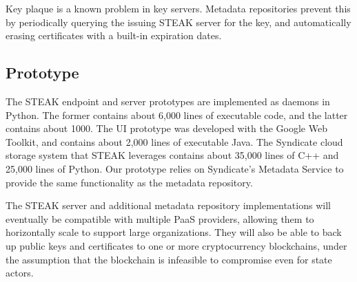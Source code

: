 Key plaque is a known problem in key servers.  Metadata repositories prevent this by periodically querying the issuing STEAK server for the key, and automatically erasing certificates with a built-in expiration dates.

\subsection{Prototype}
The STEAK endpoint and server prototypes are implemented as daemons in Python.  The former contains about 6,000 lines of executable code, and the latter contains about 1000.  The UI prototype was developed with the Google Web Toolkit, and contains about 2,000 lines of executable Java. The Syndicate cloud storage system that STEAK leverages contains about 35,000 lines of C++ and 25,000 lines of Python.  Our prototype relies on Syndicate’s Metadata Service to provide the same functionality as the metadata repository.

The STEAK server and additional metadata repository implementations will eventually be compatible with multiple PaaS providers, allowing them to horizontally scale to support large organizations.  They will also be able to back up public keys and certificates to one or more cryptocurrency blockchains, under the assumption that the blockchain is infeasible to compromise even for state actors.
